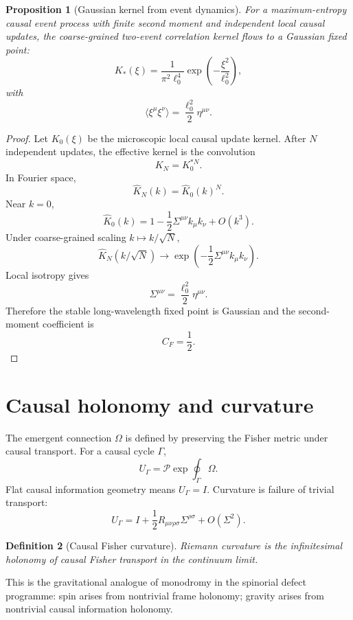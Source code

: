 \documentclass[11pt]{article}
\newtheorem{definition}{Definition}[section]
\newtheorem{proposition}[definition]{Proposition}
\begin{document}
\begin{proposition}[Gaussian kernel from event dynamics]
For a maximum-entropy causal event process with finite second moment and independent local causal updates, the coarse-grained two-event correlation kernel flows to a Gaussian fixed point:
\[
K_*(\xi)=\frac{1}{\pi^2\ell_0^4}
\exp\left(-\frac{\xi^2}{\ell_0^2}\right),
\]
with
\[
\langle \xi^\mu\xi^\nu\rangle
=
\frac{\ell_0^2}{2}\eta^{\mu\nu}.
\]
\end{proposition}

\begin{proof}
Let $K_0(\xi)$ be the microscopic local causal update kernel. After $N$ independent updates, the effective kernel is the convolution
\[
K_N=K_0^{*N}.
\]
In Fourier space,
\[
\widehat K_N(k)=\widehat K_0(k)^N.
\]
Near $k=0$,
\[
\widehat K_0(k)
=
1-\frac12\Sigma^{\mu\nu}k_\mu k_\nu+O(k^3).
\]
Under coarse-grained scaling $k\mapsto k/\sqrt N$,
\[
\widehat K_N(k/\sqrt N)
\to
\exp\left(-\frac12\Sigma^{\mu\nu}k_\mu k_\nu\right).
\]
Local isotropy gives
\[
\Sigma^{\mu\nu}
=
\frac{\ell_0^2}{2}\eta^{\mu\nu}.
\]
Therefore the stable long-wavelength fixed point is Gaussian and the second-moment coefficient is
\[
C_F=\frac12.
\]
\end{proof}


\section{Causal holonomy and curvature}

The emergent connection $\Omega$ is defined by preserving the Fisher metric under causal transport. For a causal cycle $\Gamma$,
\begin{equation}
U_\Gamma=\mathcal P\exp\oint_\Gamma\Omega.
\end{equation}
Flat causal information geometry means $U_\Gamma=I$. Curvature is failure of trivial transport:
\begin{equation}
U_\Gamma=I+\frac12R_{\mu\nu\rho\sigma}\Sigma^{\rho\sigma}+O(\Sigma^2).
\end{equation}

\begin{definition}[Causal Fisher curvature]
Riemann curvature is the infinitesimal holonomy of causal Fisher transport in the continuum limit.
\end{definition}

This is the gravitational analogue of monodromy in the spinorial defect programme: spin arises from nontrivial frame holonomy; gravity arises from nontrivial causal information holonomy.
\end{document}
